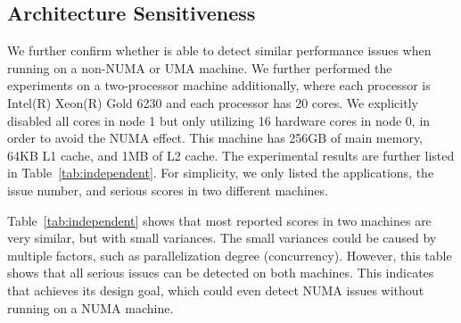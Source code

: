 
\subsection{Architecture Sensitiveness}
\label{sec:archindependent}

We further confirm whether \NP{} is able to detect similar performance issues when running on a non-NUMA or UMA machine. We further performed the experiments on a two-processor machine additionally, where each processor is Intel(R) Xeon(R) Gold 6230 and each processor has 20 cores. We explicitly disabled all cores in node 1 but only utilizing 16 hardware cores in node 0, in order to avoid the NUMA effect. This machine has 256GB of main memory, 64KB L1 cache, and 1MB of L2 cache. The experimental results are further listed in Table~\ref{tab:independent}. For simplicity, we only listed the applications, the issue number, and serious scores in two different machines. 

Table~\ref{tab:independent} shows that most reported scores in two machines are very similar, but with small variances. The small variances could be caused by multiple factors, such as parallelization degree (concurrency). However, this table shows that all serious issues can be detected on both machines. This indicates that \NP{} achieves its design goal, which could even detect NUMA issues without running on a NUMA machine. 


    



